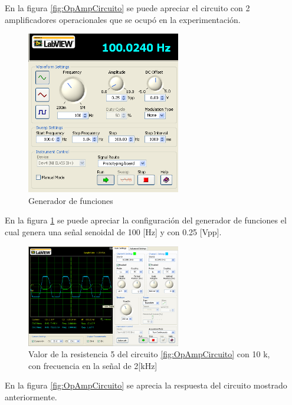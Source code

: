 \documentclass[]{article}
\begin{document}
En la figura \ref{fig:OpAmpCircuito} se puede apreciar el circuito con 2 amplificadores operacionales que se ocupó en la experimentación.\\

\begin{figure}[h!]
	\centering
	\includegraphics[width=0.6\textwidth]{Imagenes/fgen250mVpp100Hzdosaplisprac4}
	\caption{Generador de funciones}
	\label{fig:primerCircuito}
\end{figure}

En la figura \ref{fig:primerCircuito} se puede apreciar la configuración del generador de funciones el cual genera una señal senoidal de 100 [Hz] y con 0.25 [Vpp].\\

\begin{figure}[h!]
	\centering
	\includegraphics[width=0.6\textwidth]{Imagenes/r5es10kfrec2Kprac4.png}
	\caption{Valor de la resistencia 5 del circuito \ref{fig:OpAmpCircuito} con 10 k, con frecuencia en la señal de 2[kHz]}
	\label{fig:2K}
\end{figure}

En la figura \ref{fig:OpAmpCircuito} se aprecia la respuesta del circuito mostrado anteriormente.\\
\end{document}
